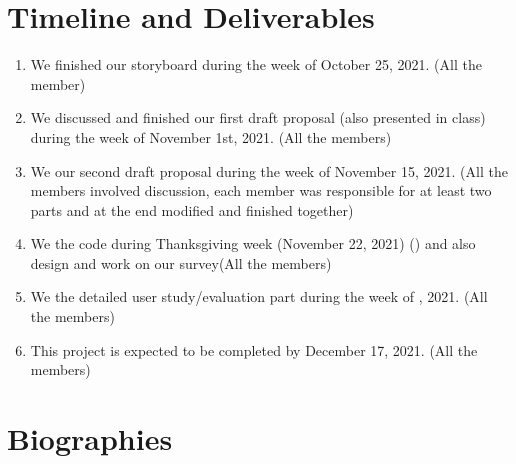 \documentclass[acmsmall, nonacm]{acmart}
\begin{document}
\section{Timeline and Deliverables}

\begin{enumerate}
  \item We finished our storyboard during the week of October 25, 2021. (All the
    member)
  \item We discussed and finished our first draft proposal (also presented in
    class) during the week of November 1st, 2021. (All the members)
  \item We  our second draft proposal during the
    week of November 15, 2021. (All the members involved discussion, each member
    was responsible for at least two parts and at the end modified and finished
    together)
  \item We  the code during
    Thanksgiving week (November 22,
    2021) () and also design and work on our
    survey(All the members)
  \item We  the detailed user
    study/evaluation part during the week of , 2021. (All the members)
  \item This project is expected to be completed by December 17, 2021. (All the
    members)
\end{enumerate}

\section{Biographies}
\end{document}
